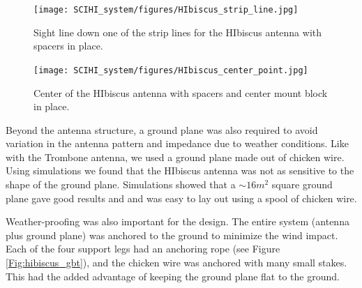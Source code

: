 \begin{figure}[htb]
\centering
\begin{minipage}[b]{0.52\textwidth}
\centering
\texttt{[image: SCIHI\_system/figures/HIbiscus\_strip\_line.jpg]}
\caption{Sight line down one of the strip lines for the HIbiscus antenna with spacers in place.}
\label{Fig:hibiscus_spacer}
\end{minipage}%
\begin{minipage}[b]{0.02\textwidth}
\hspace{1cm}
\end{minipage}%
\begin{minipage}[b]{0.42\textwidth}
\centering
\texttt{[image: SCIHI\_system/figures/HIbiscus\_center\_point.jpg]}
\caption{Center of the HIbiscus antenna with spacers and center mount block in place.}
\label{Fig:hibiscus_center}
\end{minipage}
\end{figure}

Beyond the antenna structure, a ground plane was also required to avoid variation in the antenna pattern and impedance due to weather conditions. Like with the Trombone antenna, we used a ground plane made out of chicken wire. Using simulations we found that the HIbiscus antenna was not as sensitive to the shape of the ground plane. Simulations showed that a $\sim16 m^2$ square ground plane gave good results and and was easy to lay out using a spool of chicken wire. 

Weather-proofing was also important for the design. The entire system (antenna plus ground plane) was anchored to the ground to minimize the wind impact. Each of the four support legs had an anchoring rope (see Figure \ref{Fig:hibiscus_gbt}), and the chicken wire was anchored with many small stakes. This had the added advantage of keeping the ground plane flat to the ground. 

